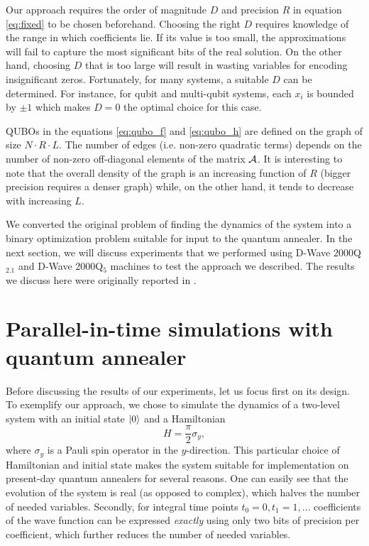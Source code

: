 Our approach requires the order of magnitude $D$ and precision $R$ in equation
\eqref{eq:fixed} to be chosen beforehand. Choosing the right $D$ requires
knowledge of the range in which coefficients lie. If its value is too small,
the approximations will fail to capture the most significant bits of the real
solution. On the other hand, choosing $D$ that is too large will result in
wasting variables for encoding insignificant zeros. Fortunately, for many
systems, a suitable $D$ can be determined. For instance, for qubit and
multi-qubit systems, each $x_i$ is bounded by $\pm 1$ which makes $D=0$ the
optimal choice for this case.

QUBOs in the equations \eqref{eq:qubo_f} and \eqref{eq:qubo_h} are defined on
the graph of size $N \cdot R \cdot L$. The number of edges (i.e. non-zero
quadratic terms) depends on the number of non-zero off-diagonal elements of the
matrix $\mathcal{A}$. It is interesting to note that the overall density of the
graph is an increasing function of $R$ (bigger precision requires a denser
graph) while, on the other hand, it tends to decrease with increasing $L$.

We converted the original problem of finding the dynamics of the system into a
binary optimization problem suitable for input to the quantum annealer. In the
next section, we will discuss experiments that we performed using D-Wave
2000Q$_{2.1}$ and D-Wave 2000Q$_5$ machines to test the approach we described.
The results we discuss here were originally reported in \cite{parallelintime}.

\section[Parallel-in-time simulations]{Parallel-in-time simulations with quantum annealer}
Before discussing the results of our experiments, let us focus first on its
design. To exemplify our approach, we chose to simulate the dynamics of a
two-level system with an initial state $\ket{0}$ and a Hamiltonian
\begin{equation}
  H = \frac{\pi}{2}\sigma_y,
\end{equation}
where $\sigma_y$ is a Pauli spin operator in the
$y$-direction. This particular choice of Hamiltonian and initial state makes
the system suitable for implementation on present-day quantum annealers for
several reasons. One can easily see that the evolution of the system is real
(as opposed to complex), which halves the number of needed variables. Secondly,
for integral time points $t_0=0, t_1=1, \ldots$ coefficients of the wave
function can be expressed \emph{exactly} using only two bits of precision per
coefficient, which further reduces the number of needed variables.

